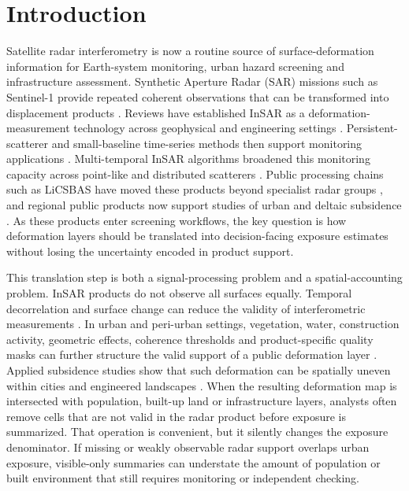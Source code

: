\documentclass[pdflatex,sn-mathphys-ay]{sn-jnl}
\begin{document}
\maketitle

\section{Introduction}

Satellite radar interferometry is now a routine source of surface-deformation information for Earth-system monitoring, urban hazard screening and infrastructure assessment. Synthetic Aperture Radar (SAR) missions such as Sentinel-1 provide repeated coherent observations that can be transformed into displacement products \citep{bamler1998insar,rosen2000insar,torres2012gmes_sentinel1}. Reviews have established InSAR as a deformation-measurement technology across geophysical and engineering settings \citep{massonnet1998insar,burgmann2000insar}. Persistent-scatterer and small-baseline time-series methods then support monitoring applications \citep{ferretti2001ps,berardino2002sbas}. Multi-temporal InSAR algorithms broadened this monitoring capacity across point-like and distributed scatterers \citep{ferretti2011squeeSAR,yunjun2019mintpy}. Public processing chains such as LiCSBAS have moved these products beyond specialist radar groups \citep{morishita2020licsbas}, and regional public products now support studies of urban and deltaic subsidence \citep{morishita2021japan,haghshenas2024iran}. As these products enter screening workflows, the key question is how deformation layers should be translated into decision-facing exposure estimates without losing the uncertainty encoded in product support.

This translation step is both a signal-processing problem and a spatial-accounting problem. InSAR products do not observe all surfaces equally. Temporal decorrelation and surface change can reduce the validity of interferometric measurements \citep{zebker1992decorrelation}. In urban and peri-urban settings, vegetation, water, construction activity, geometric effects, coherence thresholds and product-specific quality masks can further structure the valid support of a public deformation layer \citep{crosetto2016psi_review}. Applied subsidence studies show that such deformation can be spatially uneven within cities and engineered landscapes \citep{raucoules2007ground_subsidence,tomas2010murcia}. When the resulting deformation map is intersected with population, built-up land or infrastructure layers, analysts often remove cells that are not valid in the radar product before exposure is summarized. That operation is convenient, but it silently changes the exposure denominator. If missing or weakly observable radar support overlaps urban exposure, visible-only summaries can understate the amount of population or built environment that still requires monitoring or independent checking.
\end{document}
